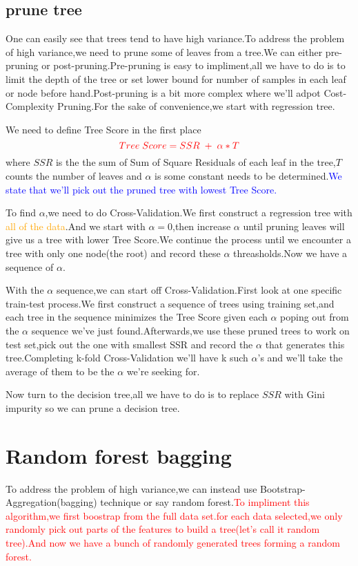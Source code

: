 \documentclass{article}
\begin{document}
\subsection{prune tree}
One can easily see that trees tend to have high variance.To address the problem of high variance,we need to prune some of leaves from a tree.We can either pre-pruning or post-pruning.Pre-pruning is easy to impliment,all we have to do is to limit the depth of the tree or set lower bound for number of samples in each leaf or node before hand.Post-pruning is a bit more complex where we'll adpot Cost-Complexity Pruning.For the sake of convenience,we start with regression tree.

We need to define Tree Score in the first place$$\textcolor{red}{Tree\;Score=SSR\;+\;\alpha*T}$$where $SSR$ is the the sum of Sum of Square Residuals of each leaf in the tree,$T$ counts the number of leaves and $\alpha$ is some constant needs to be determined.\textcolor{blue}{We state that we'll pick out the pruned tree with lowest Tree Score.}

To find $\alpha$,we need to do Cross-Validation.We first construct a regression tree with \textcolor{orange}{all of the data}.And we start with $\alpha=0$,then increase $\alpha$ until pruning leaves will give us a tree with lower Tree Score.We continue the process until we encounter a tree with only one node(the root) and record these $\alpha$ threasholds.Now we have a sequence of $\alpha$.

With the $\alpha$ sequence,we can start off Cross-Validation.First look at one specific train-test process.We first construct a sequence of trees using training set,and each tree in the sequence minimizes the Tree Score given each $\alpha$ poping out from the $\alpha$ sequence we've just found.Afterwards,we use these pruned trees to work on test set,pick out the one with smallest SSR and record the $\alpha$ that generates this tree.Completing k-fold Cross-Validation we'll have k such $\alpha$'s and we'll take the average of them to be the $\alpha$ we're seeking for.

Now turn to the decision tree,all we have to do is to replace $SSR$ with Gini impurity so we can prune a decision tree.
\section{Random forest bagging}
To address the problem of high variance,we can instead use Bootstrap-Aggregation(bagging) technique or say random forest.\textcolor{red}{To impliment this algorithm,we first boostrap from the full data set.for each data selected,we only randomly pick out parts of the features to build a tree(let's call it random tree).And now we have a bunch of randomly generated trees forming a random forest.}
\end{document}

